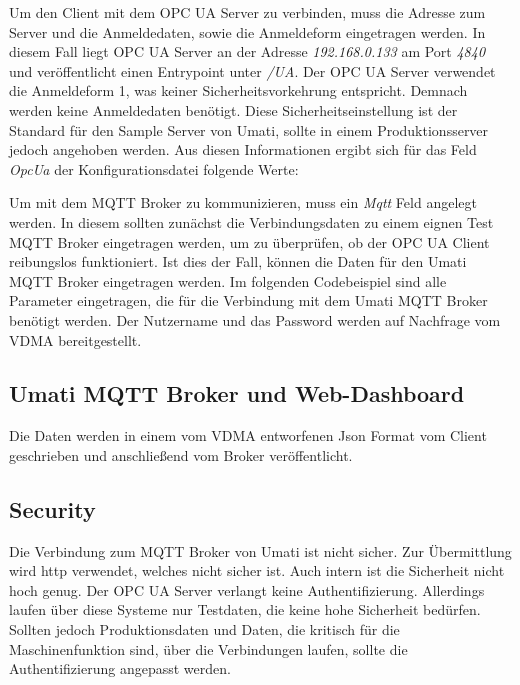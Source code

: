 \documentclass[a4paper, 12pt, oneside, toc=listofnumbered, bibliography=totoc]{scrbook}
\begin{document}
		Um den Client mit dem OPC UA Server zu verbinden, muss die Adresse zum Server und die Anmeldedaten, sowie die Anmeldeform eingetragen werden. In diesem Fall liegt OPC UA Server an der Adresse \textit{192.168.0.133} am Port \textit{4840} und veröffentlicht einen Entrypoint unter \textit{/UA}. Der OPC UA Server verwendet die Anmeldeform 1, was keiner Sicherheitsvorkehrung entspricht. Demnach werden keine Anmeldedaten benötigt. Diese Sicherheitseinstellung ist der Standard für den Sample Server von Umati, sollte in einem Produktionsserver jedoch angehoben werden. Aus diesen Informationen ergibt sich für das Feld \textit{OpcUa} der Konfigurationsdatei folgende Werte:
		
		
		
		Um mit dem MQTT Broker zu kommunizieren, muss ein \textit{Mqtt} Feld angelegt werden. In diesem sollten zunächst die Verbindungsdaten zu einem eignen Test MQTT Broker eingetragen werden, um zu überprüfen, ob der OPC UA Client reibungslos funktioniert. Ist dies der Fall, können die Daten für den Umati MQTT Broker eingetragen werden. Im folgenden Codebeispiel sind alle Parameter eingetragen, die für die Verbindung mit dem Umati MQTT Broker benötigt werden. Der Nutzername und das Password werden auf Nachfrage vom VDMA bereitgestellt.
		
		
		
		\subsection{Umati MQTT Broker und Web-Dashboard}
		
		Die Daten werden in einem vom VDMA entworfenen Json Format vom Client geschrieben und anschließend vom Broker veröffentlicht. 
		
	
		\subsection{Security}
		
		Die Verbindung zum MQTT Broker von Umati ist nicht sicher. Zur Übermittlung wird http verwendet, welches nicht sicher ist. Auch intern ist die Sicherheit nicht hoch genug. Der OPC UA Server verlangt keine Authentifizierung. Allerdings laufen über diese Systeme nur Testdaten, die keine hohe Sicherheit bedürfen. Sollten jedoch Produktionsdaten und Daten, die kritisch für die Maschinenfunktion sind, über die Verbindungen laufen, sollte die Authentifizierung angepasst werden. 
		
\end{document}
